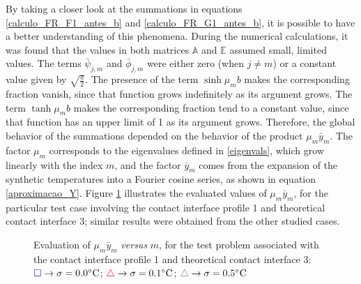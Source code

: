 \documentclass[12pt]{CHT-20}
\begin{document}
By taking a closer look at the summations in equations \eqref{calculo_FR_F1_antes_b} and \eqref{calculo_FR_G1_antes_b}, it is possible to have a better understanding of this phenomena. During the numerical calculations, it was found that the values in both matrices $\mathbb{A}$ and $\mathbb{E}$ assumed small, limited values. The terms $\bar{\psi}_{j, m}$ and $\bar{\phi}_{j, m}$ were either zero (when $j \ne m$) or a constant value given by $\sqrt{\frac{a}{2}}$. The presence of the term $\sinh\mu_m b$ makes the corresponding fraction vanish, since that function grows indefinitely as its argument grows. The term $\tanh\mu_m b$ makes the corresponding fraction tend to a constant value, since that function has an upper limit of 1 as its argument grows. Therefore, the global behavior of the summations depended on the behavior of the product $\mu_m\bar{y}_m$. The factor $\mu_m$ corresponds to the eigenvalues defined in \eqref{eigenvals}, which grow linearly with the index $m$, and the factor $\bar{y}_m$ comes from the expansion of the synthetic temperatures into a Fourier cosine series, as shown in equation \eqref{aproximacao_Y}. Figure \ref{amplitude} illustrates the evaluated values of $\mu_m\bar{y}_m$, for the particular test case involving the contact interface profile 1 and theoretical contact interface 3; similar results were obtained from the other studied cases.

\begin{figure}[H]
	\begin{center}		
		\caption{Evaluation of $\mu_m\bar{y}_m$ \textit{versus} $m$, for the test problem associated with the contact interface profile 1 and theoretical contact interface 3: $\textcolor{blue}{\square} \rightarrow \sigma = 0.0\celsius$; $\textcolor{red}{\triangle} \rightarrow \sigma = 0.1\celsius$; $\textcolor{gray}{\triangle} \rightarrow \sigma = 0.5\celsius$}
		\label{amplitude}
	\end{center}
\end{figure}
\end{document}
